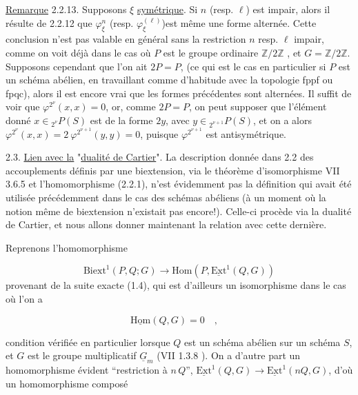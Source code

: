
\underline{Remarque} 2.2.13. Supposons $\xi$ \underline{symétrique}. Si $n$ (resp. $\ell$) est impair, alors il résulte de 2.2.12 que $\varphi^n_\xi$ (resp. $\varphi^{(\ell)}_\xi$)est même une forme alternée. Cette conclusion n'est pas valable en général sans la restriction $n$ resp. $\ell$ impair, comme on voit déjà dans le cas où $P$ est le groupe ordinaire $\mathbb{Z}/2\mathbb{Z}$ , et $G = \mathbb{Z}/2\mathbb{Z}$. Supposons cependant que l'on ait $2P = P$, (ce qui est le cas en particulier si $P$ est un schéma abélien, en travaillant comme d'habitude avec la topologie fppf ou fpqc), alors il est encore vrai que les formes précédentes sont alternées. Il suffit de voir que $\varphi^{2^\nu}(x,x) = 0$, or, comme $2P=P$, on peut supposer que l'élément donné $x \in {}_{2^\nu}P(S)$ est de la forme $2y$, avec $y \in {}_{2^{\nu+1}}P(S)$, et on a alors $\varphi^{2^\nu}(x,x) = 2\ \varphi^{2^{\nu+1}}(y,y) = 0$, puisque $\varphi^{2^{\nu+1}}$ est antisymétrique.

2.3. \underline{Lien avec la} "\underline{dualité de Cartier}". La description donnée dans 2.2 des accouplements définis par une biextension, via le théorème d'isomorphisme VII 3.6.5 et l'homomorphisme (2.2.1), n'est évidemment pas la définition qui avait été utilisée précédemment dans le cas des schémas abéliens (à un moment où la notion même de biextension n'existait pas encore!). Celle-ci procède via la dualité de Cartier, et nous allons donner maintenant la relation avec cette dernière.

Reprenons l'homomorphisme

\begin{equation}\tag{2.3.1}
\mathrm{Biext}^1(P,Q;G) \longrightarrow \mathrm{Hom}(P,\underline{\mathrm{Ext}}^1(Q,G))
\end{equation}
provenant de la suite exacte (1.4), qui est d'ailleurs un isomorphisme dans le cas où l'on a

\begin{equation}\tag{2.3.2}
\underline{\mathrm{Hom}}(Q,G) = 0 \quad , \quad 
\end{equation}


 condition vérifiée en particulier lorsque $Q$ est un schéma abélien sur un schéma $S$, et $G$ est le groupe multiplicatif $\underline{G}_m$ (VII 1.3.8 ). On a d'autre part un homomorphisme évident ``restriction à $n\,Q$'', $\underline{\mathrm{Ext}}^1(Q,G) \to \underline{\mathrm{Ext}}^1(nQ,G)$, d'où un homomorphisme composé

